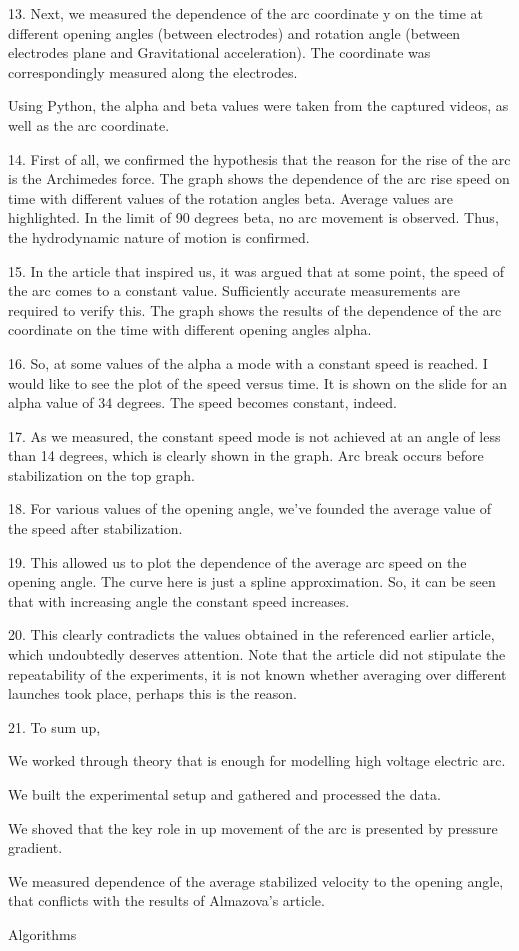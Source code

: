 
13.
Next, we measured the dependence of the arc coordinate y on the time at different 
opening angles (between electrodes) 
and rotation angle (between electrodes plane and Gravitational acceleration). 
The coordinate was correspondingly measured along the electrodes. 

Using Python, the alpha and beta values ​​were taken from the captured videos, as well as the arc coordinate.


14.
First of all, we confirmed the hypothesis that the reason for the rise of the arc is the Archimedes force. The graph shows the dependence of the arc rise speed on time with different values of the rotation angles beta. Average values ​​are highlighted. In the limit of 90 degrees beta, no arc movement is observed. 
Thus, the hydrodynamic nature of motion is confirmed.



15.
In the article that inspired us, it was argued that at some point, the speed of the arc comes to a constant value. Sufficiently accurate measurements are required to verify this. The graph shows the results of the dependence of the arc coordinate on the time with different opening angles alpha.

16.
So, at some values ​​of the alpha a mode with a constant speed is reached.
I would like to see the plot of the speed versus time.
It is shown on the slide for an alpha value of 34 degrees.
The speed becomes constant, indeed.


17.
As we measured, the constant speed mode is not achieved at an angle of less than 14 degrees, which is clearly shown in the graph. Arc break occurs before stabilization on the top graph.


18.
For various values ​​of the opening angle, we've founded the average value of the speed after stabilization.


19.
This allowed us to plot the dependence of the average arc speed on the opening angle. The curve here is just a spline approximation. So, it can be seen that with increasing angle the constant speed increases.


20.
This clearly contradicts the values ​​obtained in the referenced earlier article,
which undoubtedly deserves attention. 
Note that the article did not stipulate the repeatability of the experiments, it is not known whether averaging over different launches took place, perhaps this is the reason.


21. 
To sum up, 

We worked through theory that is enough for modelling high
voltage electric arc.

We built the experimental setup and gathered and processed
the data.

We shoved that the key role in up movement of the arc is
presented by pressure gradient.

We measured dependence of the average stabilized velocity to
the opening angle, that conflicts with the results of Almazova's
article.

Algorithms